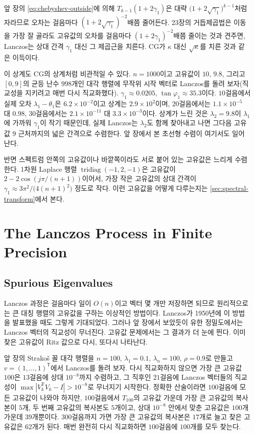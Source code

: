 앞 장의 \eqref{eq:chebyshev-outside}에 의해 $T_{k-1}(1+2\gamma_1)$은 대략 $\bigl(1+2\sqrt{\gamma_1}\bigr)^{k-1}$처럼 자라므로 오차는 걸음마다 $(1+2\sqrt{\gamma_1})^{-2}$배쯤 줄어든다. 23장의 거듭제곱법은 이동을 가장 잘 골라도 고유값의 오차를 걸음마다 $(1+2\gamma_1)^{-2}$배쯤 줄이는 것과 견주면, Lanczos는 상대 간격 $\gamma_1$ 대신 그 제곱근을 치른다. CG가 $\kappa$ 대신 $\sqrt\kappa$를 치른 것과 같은 이득이다.

이 상계도 CG의 상계처럼 비관적일 수 있다. $n=1000$이고 고유값이 $10$, $9.8$, 그리고 $[0,9]$의 균등 난수 $998$개인 대각 행렬에 무작위 시작 벡터로 Lanczos를 돌려 보자(직교성을 지키려고 매번 다시 직교화했다). $\gamma_1\approx0.0205$, $\tan\varphi_1\approx35.3$이다. $10$걸음에서 실제 오차 $\lambda_1-\theta_1$은 $6.2\times10^{-2}$이고 상계는 $2.9\times10^2$이며, $20$걸음에서는 $1.1\times10^{-5}$ 대 $0.98$, $30$걸음에서는 $2.1\times10^{-11}$ 대 $3.3\times10^{-3}$이다. 상계가 느린 것은 $\lambda_2=9.8$이 $\lambda_1$에 가까워 $\gamma_1$이 작기 때문인데, 실제 Lanczos는 $\lambda_2$도 함께 찾아내고 나면 그다음 고유값 $9$ 근처까지의 넓은 간격으로 수렴한다. 앞 장에서 본 초선형 수렴이 여기서도 일어난다.

반면 스펙트럼 안쪽의 고유값이나 바깥쪽이라도 서로 붙어 있는 고유값은 느리게 수렴한다. 1차원 Laplace 행렬 $\operatorname{tridiag}(-1,2,-1)$은 고유값이 $2-2\cos(j\pi/(n+1))$이어서, 가장 작은 고유값의 상대 간격이 $\gamma_1\approx3\pi^2/\bigl(4(n+1)^2\bigr)$ 정도로 작다. 이런 고유값을 어떻게 다루는지는 \cref{sec:spectral-transform}에서 본다.

\section{The Lanczos Process in Finite Precision}
\label{sec:lanczos-finite}

\subsection{Spurious Eigenvalues}

Lanczos 과정은 걸음마다 일이 $O(n)$이고 벡터 몇 개만 저장하면 되므로 원리적으로는 큰 대칭 행렬의 고유값을 구하는 이상적인 방법이다. Lanczos가 1950년에 이 방법을 발표했을 때도 그렇게 기대되었다\cite{lanczos1950}. 그러나 앞 장에서 보았듯이 유한 정밀도에서는 Lanczos 벡터의 직교성이 무너진다. 고유값 문제에서는 그 결과가 더 눈에 띈다. 이미 찾은 고유값이 Ritz 값으로 다시, 또다시 나타난다.

앞 장의 Strakoš 꼴 대각 행렬을 $n=100$, $\lambda_1=0.1$, $\lambda_n=100$, $\rho=0.9$로 만들고 $v=(1,\dots,1)^{\mathsf T}$에서 Lanczos를 돌려 보자. 다시 직교화하지 않으면 가장 큰 고유값 $100$은 $13$걸음에 상대 $10^{-8}$까지 수렴하고, 그 직후인 $21$걸음에 Lanczos 벡터들의 직교성이 $\max|V_k^{\mathsf T}V_k-I|>10^{-8}$로 무너지기 시작한다. 정확한 산술이라면 $100$걸음에 모든 고유값이 나와야 하지만, $100$걸음에서 $T_{100}$의 고유값 가운데 가장 큰 고유값의 복사본이 $5$개, 두 번째 고유값의 복사본도 $5$개이고, 상대 $10^{-8}$ 안에서 맞춘 고유값은 $100$개 가운데 $39$개뿐이다. $300$걸음까지 가면 가장 큰 고유값의 복사본은 $17$개로 늘고 찾은 고유값은 $62$개가 된다. 매번 완전히 다시 직교화하면 $100$걸음에 $100$개를 모두 찾는다.

